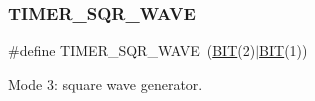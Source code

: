 \subsubsection{\texorpdfstring{T\+I\+M\+E\+R\+\_\+\+S\+Q\+R\+\_\+\+W\+A\+VE}{TIMER\_SQR\_WAVE}}
{\footnotesize\ttfamily \#define T\+I\+M\+E\+R\+\_\+\+S\+Q\+R\+\_\+\+W\+A\+VE~(\mbox{\hyperlink{group__uart_ga3a8ea58898cb58fc96013383d39f482c}{B\+IT}}(2)$\vert$\mbox{\hyperlink{group__uart_ga3a8ea58898cb58fc96013383d39f482c}{B\+IT}}(1))}



Mode 3\+: square wave generator. 

